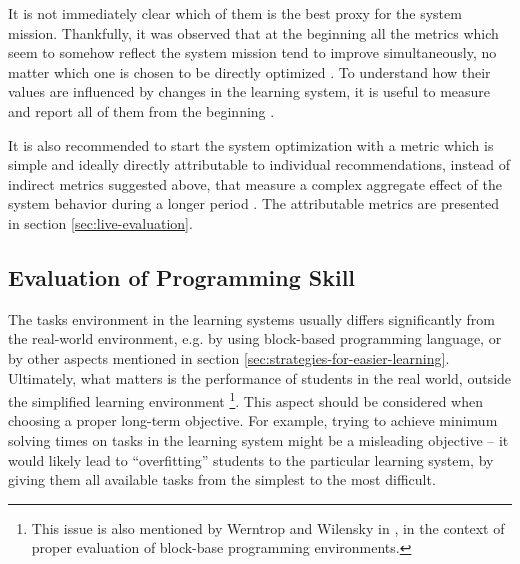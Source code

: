 It is not immediately clear which of them is the best proxy for the system mission.
Thankfully, it was observed that at the beginning all the metrics which seem to somehow
reflect the system mission tend to improve simultaneously, no matter which one
is chosen to be directly optimized \cite[][Rule \#12]{google-ml-rules}.
To understand how their values are influenced by changes in the learning system,
it is useful to measure and report all of them from the beginning
\cite[][Rule \#2]{google-ml-rules}.

It is also recommended to start the system optimization with a metric which is simple
and ideally directly attributable to individual recommendations,
instead of indirect metrics suggested above, that measure a complex aggregate
effect of the system behavior during a longer period \cite[][Rule \#12]{google-ml-rules}.
The attributable metrics are presented in section \ref{sec:live-evaluation}.


\subsection{Evaluation of Programming Skill}


The tasks environment in the learning systems usually differs significantly
  from the real-world environment,
  e.g. by using block-based programming language,
  or by other aspects mentioned in section \ref{sec:strategies-for-easier-learning}.
Ultimately, what matters is the performance of students in the real world,
  outside the simplified learning environment%
\footnote{%
  This issue is also mentioned by Werntrop and Wilensky %
  in \cite{challenges-of-blocks-based-environments}, %
  in the context of proper evaluation of block-base programming environments.}.
This aspect should be considered when choosing a proper long-term objective.
For example, trying to achieve minimum solving times on tasks in the learning system
  might be a misleading objective
  -- it would likely lead to ``overfitting'' students to the particular learning system,
  by giving them all available tasks from the simplest to the most difficult.


